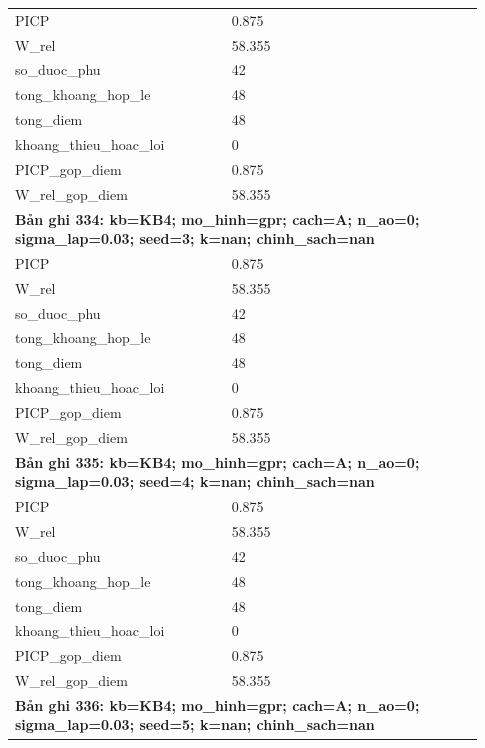 \begin{longtable}{p{0.43\linewidth}p{0.50\linewidth}}
PICP & 0.875 \\
W\_\allowbreak rel & 58.355 \\
so\_\allowbreak duoc\_\allowbreak phu & 42 \\
tong\_\allowbreak khoang\_\allowbreak hop\_\allowbreak le & 48 \\
tong\_\allowbreak diem & 48 \\
khoang\_\allowbreak thieu\_\allowbreak hoac\_\allowbreak loi & 0 \\
PICP\_\allowbreak gop\_\allowbreak diem & 0.875 \\
W\_\allowbreak rel\_\allowbreak gop\_\allowbreak diem & 58.355 \\
\midrule
\multicolumn{2}{p{0.95\linewidth}}{\textbf{Bản ghi 334: kb=KB4; mo\_hinh=gpr; cach=A; n\_ao=0; sigma\_lap=0.03; seed=3; k=nan; chinh\_sach=nan}} \\
PICP & 0.875 \\
W\_\allowbreak rel & 58.355 \\
so\_\allowbreak duoc\_\allowbreak phu & 42 \\
tong\_\allowbreak khoang\_\allowbreak hop\_\allowbreak le & 48 \\
tong\_\allowbreak diem & 48 \\
khoang\_\allowbreak thieu\_\allowbreak hoac\_\allowbreak loi & 0 \\
PICP\_\allowbreak gop\_\allowbreak diem & 0.875 \\
W\_\allowbreak rel\_\allowbreak gop\_\allowbreak diem & 58.355 \\
\midrule
\multicolumn{2}{p{0.95\linewidth}}{\textbf{Bản ghi 335: kb=KB4; mo\_hinh=gpr; cach=A; n\_ao=0; sigma\_lap=0.03; seed=4; k=nan; chinh\_sach=nan}} \\
PICP & 0.875 \\
W\_\allowbreak rel & 58.355 \\
so\_\allowbreak duoc\_\allowbreak phu & 42 \\
tong\_\allowbreak khoang\_\allowbreak hop\_\allowbreak le & 48 \\
tong\_\allowbreak diem & 48 \\
khoang\_\allowbreak thieu\_\allowbreak hoac\_\allowbreak loi & 0 \\
PICP\_\allowbreak gop\_\allowbreak diem & 0.875 \\
W\_\allowbreak rel\_\allowbreak gop\_\allowbreak diem & 58.355 \\
\midrule
\multicolumn{2}{p{0.95\linewidth}}{\textbf{Bản ghi 336: kb=KB4; mo\_hinh=gpr; cach=A; n\_ao=0; sigma\_lap=0.03; seed=5; k=nan; chinh\_sach=nan}} \\

\end{longtable}
